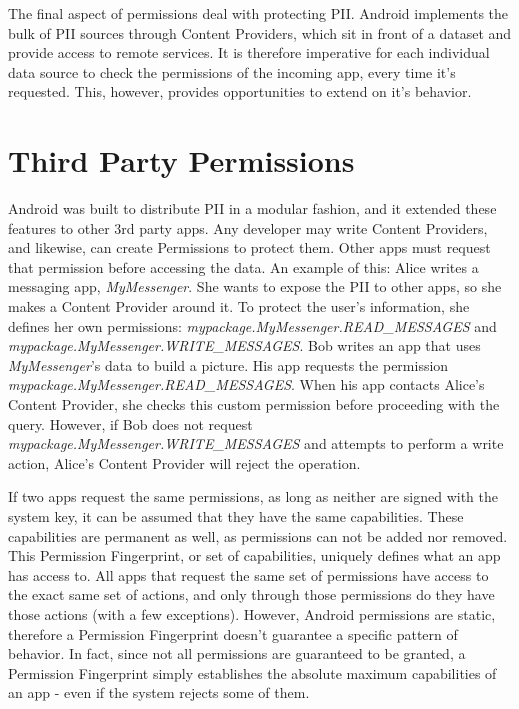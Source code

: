 The final aspect of permissions deal with protecting PII. Android implements the bulk of PII sources through Content Providers, which sit in front of a dataset and provide access to remote services. It is therefore imperative for each individual data source to check the permissions of the incoming app, every time it's requested. This, however, provides opportunities to extend on it's behavior.

\section{Third Party Permissions}
Android was built to distribute PII in a modular fashion, and it extended these features to other 3rd party apps. Any developer may write Content Providers, and likewise, can create Permissions to protect them. Other apps must request that permission before accessing the data. An example of this: Alice writes a messaging app, \textit{MyMessenger}. She wants to expose the PII to other apps, so she makes a Content Provider around it. To protect the user's information, she defines her own permissions: \textit{mypackage.MyMessenger.READ\_MESSAGES} and \textit{mypackage.MyMessenger.WRITE\_MESSAGES}. Bob writes an app that uses \textit{MyMessenger}'s data to build a picture. His app requests the permission \textit{mypackage.MyMessenger.READ\_MESSAGES}. When his app contacts Alice's Content Provider, she checks this custom permission before proceeding with the query. However, if Bob does not request \textit{mypackage.MyMessenger.WRITE\_MESSAGES} and attempts to perform a write action, Alice's Content Provider will reject the operation.

If two apps request the same permissions, as long as neither are signed with the system key, it can be assumed that they have the same capabilities. These capabilities are permanent as well, as permissions can not be added nor removed. This Permission Fingerprint, or set of capabilities, uniquely defines what an app has access to. All apps that request the same set of permissions have access to the exact same set of actions, and only through those permissions do they have those actions (with a few exceptions). However, Android permissions are static, therefore a Permission Fingerprint doesn't guarantee a specific pattern of behavior. In fact, since not all permissions are guaranteed to be granted, a Permission Fingerprint simply establishes the absolute maximum capabilities of an app - even if the system rejects some of them.
